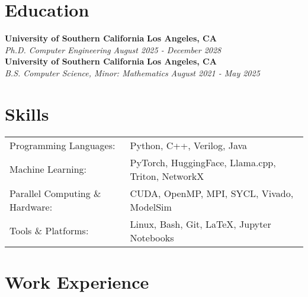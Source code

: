 \documentclass[a4paper,12pt]{article}
\begin{document}
\section{Education}
{\bf University of Southern California} \hfill {\bf Los Angeles, CA}
\\ {\em Ph.D. Computer Engineering} \hfill {\em August 2025 - December 2028}
\\
{\bf University of Southern California} \hfill {\bf Los Angeles, CA}
\\ {\em B.S. Computer Science, Minor: Mathematics} \hfill {\em August 2021 - May 2025}
\section{Skills}
\begin{tabularx}{\linewidth}{@{}l X@{}}
Programming Languages: & \normalsize{Python, C++, Verilog, Java} \\
Machine Learning: & \normalsize{PyTorch, HuggingFace, Llama.cpp, Triton, NetworkX} \\
Parallel Computing \& Hardware: & \normalsize{CUDA, OpenMP, MPI, SYCL, Vivado, ModelSim} \\
Tools \& Platforms: & \normalsize{Linux, Bash, Git, LaTeX, Jupyter Notebooks}\\
\end{tabularx}


\section{Work Experience}
\end{document}
